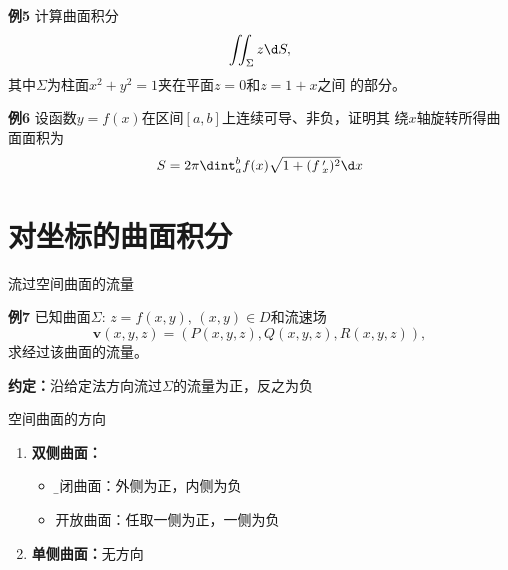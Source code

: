\begin{frame}
	\linespread{1.2}
	\begin{exampleblock}{{\bf 例5}\hfill}
		计算曲面积分
		$$\iint_{\Sigma}z\d S,$$
		其中$\Sigma$为柱面$x^2+y^2=1$夹在平面$z=0$和$z=1+x$之间
		的部分。
	\end{exampleblock}
\end{frame}

\begin{frame}
	\linespread{1.2}
	\begin{exampleblock}{{\bf 例6}\hfill}
		设函数$y=f(x)$在区间$[a,b]$上连续可导、非负，证明其
		绕$x$轴旋转所得曲面面积为
		$$S=2\pi\dint_a^bf(x)\sqrt{1+(f\,'_x)^2}\d x$$
	\end{exampleblock}
\end{frame}

\section{对坐标的曲面积分}

\begin{frame}{流过空间曲面的流量}
	\linespread{1.2}
	\begin{exampleblock}{{\bf 例7}\hfill}
		已知曲面$\Sigma:\,z=f(x,y),\,(x,y)\in D$和流速场
		$$\bm{v}(x,y,z)=(P(x,y,z),Q(x,y,z),R(x,y,z)),$$
		求经过该曲面的流量。
	\end{exampleblock}\pause 
	\alert{{\bf 约定：}沿给定法方向流过$\Sigma$的流量为正，反之为负}
\end{frame}

\begin{frame}{空间曲面的方向}
	\linespread{1.2}
	\begin{enumerate}
	  \item {\bf 双侧曲面：}
	  \begin{itemize}
	    \item {\b 封闭曲面：外侧为正，内侧为负}
	    \item 开放曲面：任取一侧为正，一侧为负
	  \end{itemize}
	  \item {\bf 单侧曲面：}无方向
	\end{enumerate}
	\begin{center}
	\end{center}
\end{frame}

